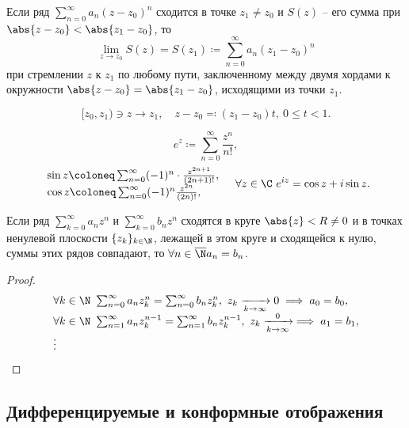 \begin{theorem}
	Если ряд $\sum_{n=0}^{\infty } a_n(z-z_0)^n$ сходится в точке $z_1 \ne z_0$ и $S(z)$ -- его сумма при $\abs{z-z_0} < \abs{z_1-z_0} $, то
	\[
		\underset{z \rightarrow z_0}{\lim} S(z) = S(z_1) \coloneq \sum_{n=0}^{\infty } a_n(z_1 - z_0)^n
	\]
	при стремлении $z$ к $z_1$ по любому пути, заключенному между двумя хордами к окружности $\abs{z-z_0}  = \abs{z_1-z_0} $, исходящими из точки $z_1$.
	\begin{figure}[H]
		\centering
		\label{fig:fig-11}
	\end{figure}
	\[
		[z_0,z_1) \ni z \rightarrow z_1, \quad z - z_0 \eqcolon (z_1 - z_0)t, \ 0 \leqslant t < 1.
	\]
\end{theorem}

\[
	e^z \coloneq \sum_{n=0}^{\infty } \frac{z^n}{n!},
\]
\[
	\begin{array}{l}
		\sin z \coloneq \sum_{n=0}^{\infty } (-1)^n \cdot \frac{z^{2n+1} }{(2n+1)!} , \\
		\cos z \coloneq \sum_{n=0}^{\infty } (-1)^n \frac{z^{2n} }{(2n)!} ,
	\end{array}
	\quad \forall z \in \C \ e^{iz} = \cos z + i\sin z.
\]

\begin{theorem}[Единственность]
	Если ряд $\sum_{k=0}^{\infty } a_nz^n$ и $\sum_{k=0}^{\infty }b_nz^n $ сходятся в круге $\abs{z} < R \ne 0$ и в точках ненулевой плоскости $\{z_k\}_{k \in \N} $, лежащей в этом круге и сходящейся к нулю, суммы этих рядов совпадают, то $\forall n \in \overline{\N} a_n = b_n$.
\end{theorem}

\begin{proof}
	\[
		\begin{array}{l}
			\forall k \in \N \ \sum_{n=0}^{\infty } a_nz_{k}^{n} = \sum_{n=0}^{\infty } b_nz_{k}^{n}, \ z_k \xrightarrow[k \rightarrow \infty ]{} 0 \implies a_0 = b_0,       \\
			\forall k \in \N \ \sum_{n=1}^{\infty } a_n z_{k}^{n-1} = \sum_{n=1}^{\infty } b_n z_{k}^{n-1} , \ z_k \xrightarrow[k \rightarrow \infty ]{0} \implies a_1 = b_1, \\
			\vdots
		\end{array}
	\]
\end{proof}

\subsection{Дифференцируемые и конформные отображения}

